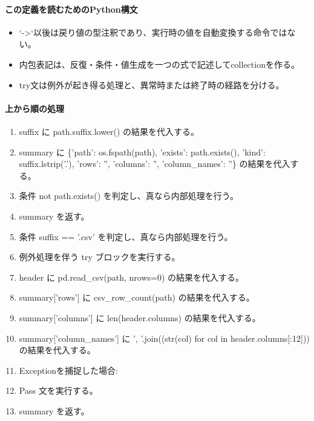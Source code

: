\documentclass[a4paper,11pt]{article}
\begin{document}
            \paragraph{この定義を読むためのPython構文}
            \begin{itemize}[leftmargin=1.6em]
            \item `->`以後は戻り値の型注釈であり、実行時の値を自動変換する命令ではない。
\item 内包表記は、反復・条件・値生成を一つの式で記述してcollectionを作る。
\item try文は例外が起き得る処理と、異常時または終了時の経路を分ける。
            \end{itemize}
            \paragraph{上から順の処理}
            \begin{enumerate}[leftmargin=1.8em]
            \item suffix に path.suffix.lower() の結果を代入する。
\item summary に \{'path': os.fspath(path), 'exists': path.exists(), 'kind': suffix.lstrip('.'), 'rows': '', 'columns': '', 'column\_names': ''\} の結果を代入する。
\item 条件 not path.exists() を判定し、真なら内部処理を行う。
\item   summary を返す。
\item 条件 suffix == '.csv' を判定し、真なら内部処理を行う。
\item   例外処理を伴う try ブロックを実行する。
\item     header に pd.read\_csv(path, nrows=0) の結果を代入する。
\item     summary['rows'] に csv\_row\_count(path) の結果を代入する。
\item     summary['columns'] に len(header.columns) の結果を代入する。
\item     summary['column\_names'] に ', '.join((str(col) for col in header.columns[:12])) の結果を代入する。
\item     Exceptionを捕捉した場合:
\item     Pass 文を実行する。
\item summary を返す。
            \end{enumerate}
\end{document}
